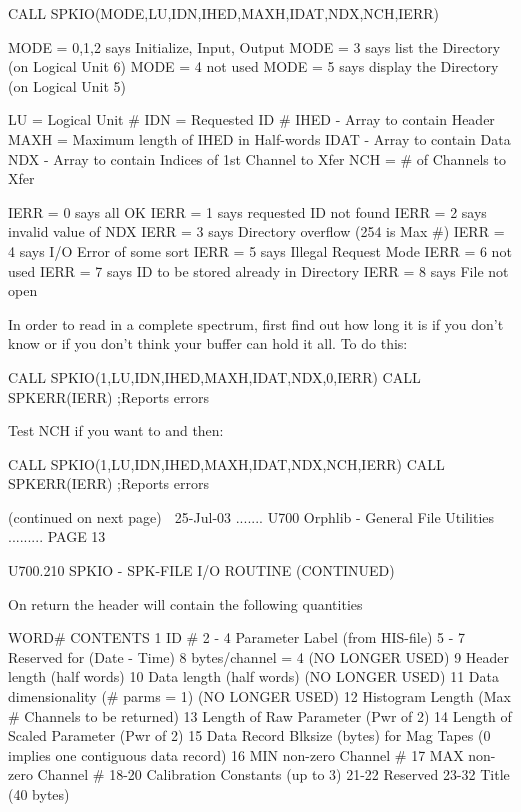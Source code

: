          CALL SPKIO(MODE,LU,IDN,IHED,MAXH,IDAT,NDX,NCH,IERR)
 
   MODE = 0,1,2 says Initialize, Input, Output
   MODE = 3 says list    the Directory (on Logical Unit 6)
   MODE = 4 not used
   MODE = 5 says display the Directory (on Logical Unit 5)
 
   LU   = Logical Unit #
   IDN  = Requested ID #
   IHED - Array to contain Header
   MAXH = Maximum length of IHED in Half-words
   IDAT - Array to contain Data
   NDX  - Array to contain Indices of 1st Channel to Xfer
   NCH  = # of Channels to Xfer
 
   IERR = 0 says all OK
   IERR = 1 says requested ID not found
   IERR = 2 says invalid value of NDX
   IERR = 3 says Directory overflow (254 is Max #)
   IERR = 4 says I/O Error of some sort
   IERR = 5 says Illegal Request Mode
   IERR = 6 not used
   IERR = 7 says ID to be stored already in Directory
   IERR = 8 says File not open
 
 
   In  order  to read in a complete spectrum, first find out how long it is if
   you don't know or if you don't think your buffer can hold  it  all.  To  do
   this:
 
         CALL SPKIO(1,LU,IDN,IHED,MAXH,IDAT,NDX,0,IERR)
         CALL SPKERR(IERR)                              ;Reports errors
 
   Test NCH if you want to and then:
 
         CALL SPKIO(1,LU,IDN,IHED,MAXH,IDAT,NDX,NCH,IERR)
         CALL SPKERR(IERR)                              ;Reports errors
 
 
                            (continued on next page)
    
   25-Jul-03 ....... U700  Orphlib - General File Utilities ......... PAGE  13
 
 
   U700.210  SPKIO    - SPK-FILE I/O ROUTINE (CONTINUED)
 
   On return the header will contain the following quantities
 
   WORD#    CONTENTS
       1    ID #
   2 - 4    Parameter Label (from HIS-file)
   5 - 7    Reserved for (Date - Time)
       8    bytes/channel = 4                 (NO LONGER USED)
       9    Header length (half words)
      10    Data length (half words)          (NO LONGER USED)
      11    Data dimensionality (# parms = 1) (NO LONGER USED)
      12    Histogram Length (Max # Channels to be returned)
      13    Length of Raw    Parameter (Pwr of 2)
      14    Length of Scaled Parameter (Pwr of 2)
      15    Data Record Blksize (bytes) for Mag Tapes
            (0 implies one contiguous data record)
      16    MIN non-zero Channel #
      17    MAX non-zero Channel #
   18-20    Calibration Constants (up to 3)
   21-22    Reserved
   23-32    Title (40 bytes)
 
